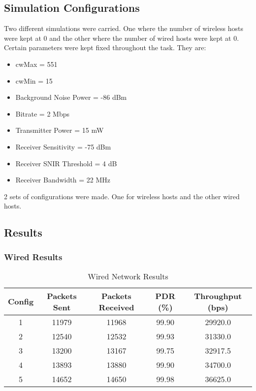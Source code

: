 \documentclass{rapport}
\begin{document}
\subsection{Simulation Configurations}
Two different simulations were carried. One where the number of wireless hosts were kept at 0 and the other where the number of wired hosts were kept at 0. Certain parameters were kept fixed throughout the task. They are:
\begin{itemize}
    \item cwMax = 551
    \item cwMin = 15
    \item Background Noise Power = -86 dBm
    \item Bitrate = 2 Mbps
    \item Transmitter Power = 15 mW
    \item Receiver Sensitivity = -75 dBm
    \item Receiver SNIR Threshold = 4 dB
    \item Receiver Bandwidth = 22 MHz
\end{itemize}
2 sets of configurations were made. One for wireless hosts and the other wired hosts.

\subsection{Results}
\subsubsection{Wired Results}
\begin{table}[H]
\centering
\caption{Wired Network Results}
\begin{tabular}{|c|c|c|c|c|}
\hline
Config & Packets Sent & Packets Received & PDR (\%) & Throughput (bps) \\
\hline
1 & 11979 & 11968 & 99.90 & 29920.0 \\
2 & 12540 & 12532 & 99.93 & 31330.0 \\
3 & 13200 & 13167 & 99.75 & 32917.5 \\
4 & 13893 & 13880 & 99.90 & 34700.0 \\
5 & 14652 & 14650 & 99.98 & 36625.0 \\
\hline
\end{tabular}
\end{table}
\end{document}
